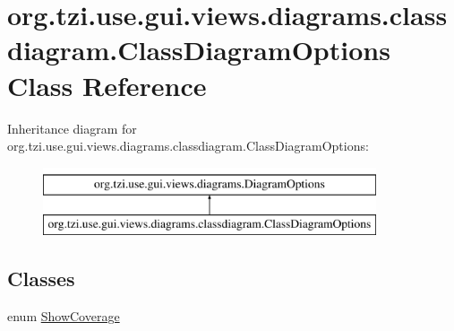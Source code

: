 \hypertarget{classorg_1_1tzi_1_1use_1_1gui_1_1views_1_1diagrams_1_1classdiagram_1_1_class_diagram_options}{\section{org.\-tzi.\-use.\-gui.\-views.\-diagrams.\-classdiagram.\-Class\-Diagram\-Options Class Reference}
\label{classorg_1_1tzi_1_1use_1_1gui_1_1views_1_1diagrams_1_1classdiagram_1_1_class_diagram_options}
}
Inheritance diagram for org.\-tzi.\-use.\-gui.\-views.\-diagrams.\-classdiagram.\-Class\-Diagram\-Options\-:\begin{figure}[H]
\begin{center}
\leavevmode
\includegraphics[height=2.000000cm]{classorg_1_1tzi_1_1use_1_1gui_1_1views_1_1diagrams_1_1classdiagram_1_1_class_diagram_options}
\end{center}
\end{figure}
\subsection*{Classes}
\begin{DoxyCompactItemize}
\item 
enum \hyperlink{enumorg_1_1tzi_1_1use_1_1gui_1_1views_1_1diagrams_1_1classdiagram_1_1_class_diagram_options_1_1_show_coverage}{Show\-Coverage}
\end{DoxyCompactItemize}
